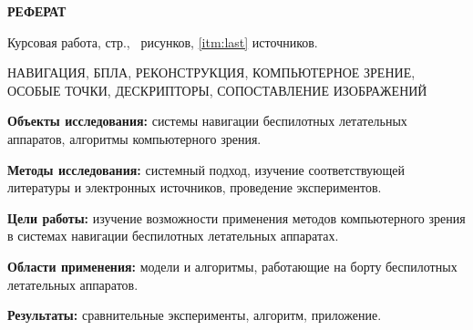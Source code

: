 \begin{center}
  \large\bfseries{РЕФЕРАТ}
\end{center}

Курсовая работа, \pageref{LastPage} стр., \totalfigures\ рисунков, \ref{itm:last} источников.

\begin{center}
  \large{НАВИГАЦИЯ, БПЛА, РЕКОНСТРУКЦИЯ, КОМПЬЮТЕРНОЕ ЗРЕНИЕ, ОСОБЫЕ ТОЧКИ, ДЕСКРИПТОРЫ, СОПОСТАВЛЕНИЕ ИЗОБРАЖЕНИЙ}
\end{center}

\textbf{Объекты исследования:} системы навигации беспилотных летательных аппаратов, алгоритмы компьютерного зрения.

\textbf{Методы исследования:} системный подход, изучение соответствующей литературы и электронных источников, проведение экспериментов.

\textbf{Цели работы:} изучение возможности применения методов компьютерного зрения в системах навигации беспилотных летательных аппаратах.

\textbf{Области применения:} модели и алгоритмы, работающие на борту беспилотных летательных аппаратов.

\textbf{Результаты:} сравнительные эксперименты, алгоритм, приложение.

\newpage
